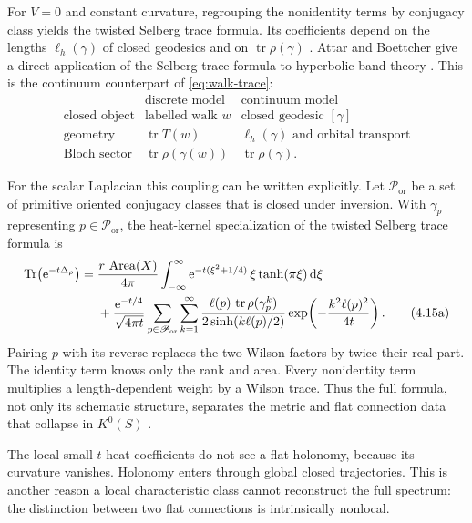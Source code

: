 \documentclass[11pt]{article}
\theoremstyle{definition}
\theoremstyle{remark}
\newcommand{\Tr}{\operatorname{Tr}}
\newcommand{\tr}{\operatorname{tr}}
\newcommand{\dd}{\mathrm d}
\newcommand{\e}{\mathrm e}
\begin{document}
For \(V=0\) and constant curvature, regrouping the nonidentity terms by
conjugacy class yields the twisted Selberg trace formula.  Its coefficients
depend on the lengths \(\ell_h(\gamma)\) of closed geodesics and on
\(\tr\rho(\gamma)\) \cite{Selberg,Buser}.  Attar and Boettcher give a direct
application of the Selberg trace formula to hyperbolic band theory
\cite{AttarBoettcher2022}.  This is the continuum counterpart of
\eqref{eq:walk-trace}:
\[
\begin{array}{c|c|c}
 &\text{discrete model}&\text{continuum model}\\
\hline
\text{closed object}&\text{labelled walk }w&\text{closed geodesic }[\gamma]\\
\text{geometry}&\tr T(w)&\ell_h(\gamma)\text{ and orbital transport}\\
\text{Bloch sector}&\tr\rho(\gamma(w))&\tr\rho(\gamma).
\end{array}
\tag{4.15}\label{eq:trace-dictionary}
\]

For the scalar Laplacian this coupling can be written explicitly.  Let
\(\mathscr P_{\mathrm{or}}\) be a set of primitive oriented conjugacy classes
that is closed under inversion.  With \(\gamma_p\) representing
\(p\in\mathscr P_{\mathrm{or}}\), the heat-kernel specialization of the
twisted Selberg trace formula is
\begin{align}
\Tr\!\left(\e^{-t\Delta_\rho}\right)
={}&
 \frac{r\,\operatorname{Area}(X)}{4\pi}
 \int_{-\infty}^{\infty}
     \e^{-t(\xi^2+1/4)}\,
     \xi\tanh(\pi\xi)\,\dd\xi \notag\\
&+
 \frac{\e^{-t/4}}{\sqrt{4\pi t}}
 \sum_{p\in\mathscr P_{\mathrm{or}}}
 \sum_{k=1}^{\infty}
 \frac{\ell(p)\,\tr\rho(\gamma_p^k)}
      {2\sinh(k\ell(p)/2)}
 \exp\!\left(-\frac{k^2\ell(p)^2}{4t}\right).
 \tag{4.15a}\label{eq:twisted-selberg-heat}
\end{align}
Pairing \(p\) with its reverse replaces the two Wilson factors by twice their
real part.
The identity term knows only the rank and area.  Every nonidentity term
multiplies a length-dependent weight by a Wilson trace.  Thus the full
formula, not only its schematic structure, separates the metric and flat
connection data that collapse in \(K^0(S)\)
\cite{Selberg,Buser}.

The local small-\(t\) heat coefficients do not see a flat holonomy, because
its curvature vanishes.  Holonomy enters through global closed trajectories.
This is another reason a local characteristic class cannot reconstruct the
full spectrum: the distinction between two flat connections is intrinsically
nonlocal.
\end{document}
